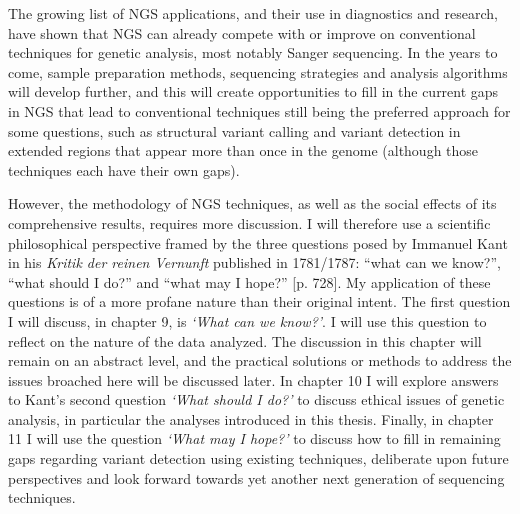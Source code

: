 The growing list of NGS applications, and their use in diagnostics and research, have shown that NGS can already compete with or improve on conventional techniques for genetic analysis, most notably Sanger sequencing. 
In the years to come, sample preparation methods, sequencing strategies and analysis algorithms will develop further, and this will create opportunities to fill in the current gaps in NGS that lead to conventional techniques still being the preferred approach for some questions, such as structural variant calling and variant detection in extended regions that appear more than once in the genome (although those techniques each have their own gaps). 

However, the methodology of NGS techniques, as well as the social effects of its comprehensive results, requires more discussion. 
I will therefore use a scientific philosophical perspective framed by the three questions posed by Immanuel Kant in his \textsl{Kritik der reinen Vernunft} published in 1781/1787: “what can we know?”, “what should I do?” and “what may I hope?” \cite{Kant_1781a}[p. 728]. 
My application of these questions is of a more profane nature than their original intent. 
The first question I will discuss, in chapter 9, is \textsl{‘What can we know?’}. 
I will use this question to reflect on the nature of the data analyzed. 
The discussion in this chapter will remain on an abstract level, and the practical solutions or methods to address the issues broached here will be discussed later. 
In chapter 10 I will explore answers to Kant’s second question \textsl{‘What should I do?’} to discuss ethical issues of genetic analysis, in particular the analyses introduced in this thesis. 
Finally, in chapter 11 I will use the question \textsl{‘What may I hope?’} to discuss how to fill in remaining gaps regarding variant detection using existing techniques, deliberate upon future perspectives and look forward towards yet another next generation of sequencing techniques.
